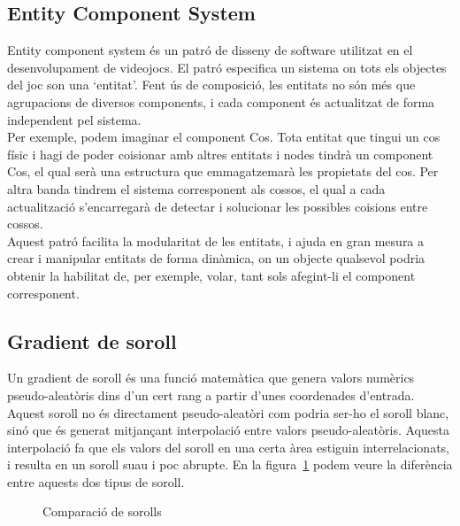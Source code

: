 \subsection{Entity Component System}
Entity component system és un patró de disseny de software utilitzat en el desenvolupament de videojocs. El patró especifica un sistema on tots els objectes del joc son una `entitat'. Fent ús de composició, les entitats no són més que agrupacions de diversos components, i cada component és actualitzat de forma independent pel sistema.
\\
Per exemple, podem imaginar el component Cos. Tota entitat que tingui un cos físic i hagi de poder co\lgem isionar amb altres entitats i nodes tindrà un component Cos, el qual serà una estructura que emmagatzemarà les propietats del cos.
Per altra banda tindrem el sistema corresponent als cossos, el qual a cada actualització s'encarregarà de detectar i solucionar les possibles co\lgem isions entre cossos.
\\
Aquest patró facilita la modularitat de les entitats, i ajuda en gran mesura a crear i manipular entitats de forma dinàmica, on un objecte qualsevol podria obtenir la habilitat de, per exemple, volar, tant sols afegint-li el component corresponent.

\subsection{Gradient de soroll}
Un gradient de soroll és una funció matemàtica que genera valors numèrics pseudo-aleatòris dins d'un cert rang a partir d'unes coordenades d'entrada. Aquest soroll no és directament pseudo-aleatòri com podria ser-ho el soroll blanc, sinó que és generat mitjançant interpolació entre valors pseudo-aleatòris.
Aquesta interpolació fa que els valors del soroll en una certa àrea estiguin interrelacionats, i resulta en un soroll suau i poc abrupte.
En la figura~\ref{fignoisecomparison} podem veure la diferència entre aquests dos tipus de soroll.
\begin{figure}[h]
  \centering
  \hfill
  \hfill
  \hfill
  \caption{Comparació de sorolls}
  \label{fignoisecomparison}
\end{figure}

